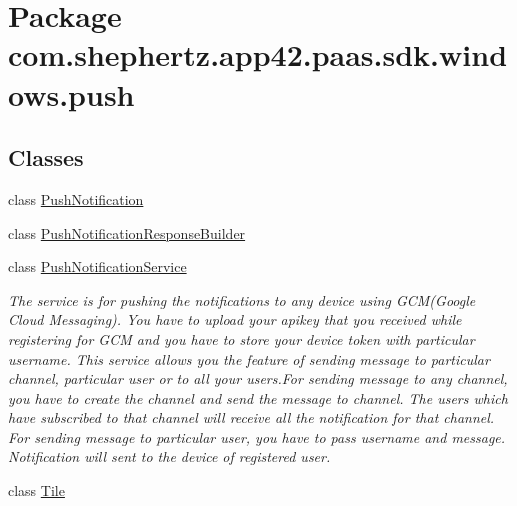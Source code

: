 \hypertarget{namespacecom_1_1shephertz_1_1app42_1_1paas_1_1sdk_1_1windows_1_1push}{\section{Package com.\+shephertz.\+app42.\+paas.\+sdk.\+windows.\+push}
\label{namespacecom_1_1shephertz_1_1app42_1_1paas_1_1sdk_1_1windows_1_1push}
}
\subsection*{Classes}
\begin{DoxyCompactItemize}
\item 
class \hyperlink{classcom_1_1shephertz_1_1app42_1_1paas_1_1sdk_1_1windows_1_1push_1_1_push_notification}{Push\+Notification}
\item 
class \hyperlink{classcom_1_1shephertz_1_1app42_1_1paas_1_1sdk_1_1windows_1_1push_1_1_push_notification_response_builder}{Push\+Notification\+Response\+Builder}
\item 
class \hyperlink{classcom_1_1shephertz_1_1app42_1_1paas_1_1sdk_1_1windows_1_1push_1_1_push_notification_service}{Push\+Notification\+Service}
\begin{DoxyCompactList}\small\item\em The service is for pushing the notifications to any device using G\+C\+M(Google Cloud Messaging). You have to upload your apikey that you received while registering for G\+C\+M and you have to store your device token with particular username. This service allows you the feature of sending message to particular channel, particular user or to all your users.\+For sending message to any channel, you have to create the channel and send the message to channel. The users which have subscribed to that channel will receive all the notification for that channel. For sending message to particular user, you have to pass username and message. Notification will sent to the device of registered user. \end{DoxyCompactList}\item 
class \hyperlink{classcom_1_1shephertz_1_1app42_1_1paas_1_1sdk_1_1windows_1_1push_1_1_tile}{Tile}
\end{DoxyCompactItemize}
